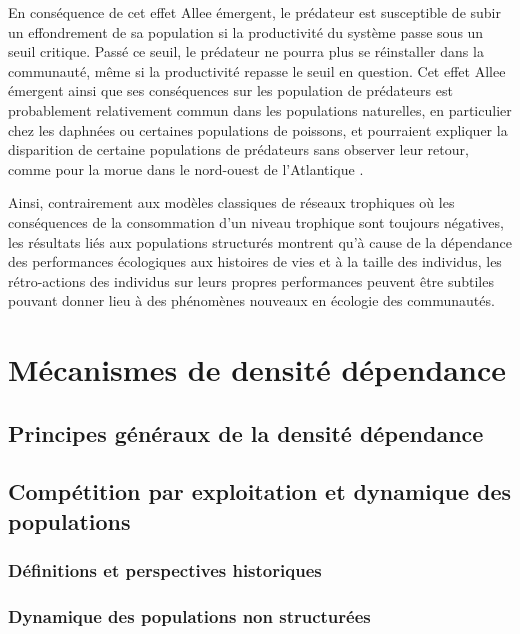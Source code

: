 En conséquence de cet effet Allee émergent, le prédateur est susceptible de
subir un effondrement de sa population si la productivité du système passe sous
un seuil critique. Passé ce seuil, le prédateur ne pourra plus se réinstaller
dans la communauté, même si la productivité repasse le seuil en question. 
Cet effet Allee émergent ainsi que ses conséquences sur les population de
prédateurs est probablement relativement commun dans les populations naturelles,
en particulier chez les daphnées \autocite{mccauley1987a} ou certaines
populations de poissons, et pourraient expliquer la disparition de certaine
populations de prédateurs sans observer leur retour, comme pour la morue dans le
nord-ouest de l'Atlantique \autocite{carscadden2001a}.

Ainsi, contrairement aux modèles classiques de réseaux  trophiques où les
conséquences de la consommation d'un niveau trophique sont toujours négatives,
les résultats liés aux populations structurés montrent qu'à cause de la
dépendance des performances écologiques aux histoires de vies et à la taille des
individus, les rétro-actions des individus sur leurs propres performances
peuvent être subtiles pouvant donner lieu à des phénomènes nouveaux en écologie
des communautés. 



\section{Mécanismes de densité dépendance}

\subsection{Principes généraux de la densité dépendance}

\subsection{Compétition par exploitation et dynamique des populations}

\subsubsection{Définitions et perspectives historiques}

\subsubsection{Dynamique des populations non structurées}

